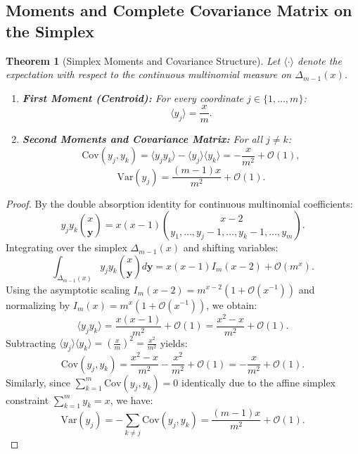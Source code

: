 \documentclass[11pt,a4paper]{article}
\theoremstyle{plain}
\newtheorem{theorem}{Theorem}[section]
\theoremstyle{definition}
\theoremstyle{remark}
\numberwithin{equation}{section}
\begin{document}
\subsection{Moments and Complete Covariance Matrix on the Simplex}

\begin{theorem}[Simplex Moments and Covariance Structure]
Let $\langle \cdot \rangle$ denote the expectation with respect to the continuous multinomial measure on $\Delta_{m-1}(x)$.
\begin{enumerate}
    \item \textbf{First Moment (Centroid):} For every coordinate $j \in \{1, \dots, m\}$:
    \begin{equation}
    \langle y_j \rangle = \frac{x}{m}.
    \end{equation}
    \item \textbf{Second Moments and Covariance Matrix:} For all $j \ne k$:
    \begin{equation}
    \mathrm{Cov}(y_j, y_k) = \langle y_j y_k \rangle - \langle y_j \rangle \langle y_k \rangle = -\frac{x}{m^2} + \mathcal{O}(1),
    \end{equation}
    \begin{equation}
    \mathrm{Var}(y_j) = \frac{(m-1)x}{m^2} + \mathcal{O}(1).
    \end{equation}
\end{enumerate}
\end{theorem}

\begin{proof}
By the double absorption identity for continuous multinomial coefficients:
\begin{equation}
y_j y_k \binom{x}{\mathbf{y}} = x(x-1) \binom{x-2}{y_1, \dots, y_j-1, \dots, y_k-1, \dots, y_m}.
\end{equation}
Integrating over the simplex $\Delta_{m-1}(x)$ and shifting variables:
\begin{equation}
\int_{\Delta_{m-1}(x)} y_j y_k \binom{x}{\mathbf{y}} d\mathbf{y} = x(x-1) I_m(x-2) + \mathcal{O}(m^x).
\end{equation}
Using the asymptotic scaling $I_m(x-2) = m^{x-2}(1 + \mathcal{O}(x^{-1}))$ and normalizing by $I_m(x) = m^x(1 + \mathcal{O}(x^{-1}))$, we obtain:
\begin{equation}
\langle y_j y_k \rangle = \frac{x(x-1)}{m^2} + \mathcal{O}(1) = \frac{x^2 - x}{m^2} + \mathcal{O}(1).
\end{equation}
Subtracting $\langle y_j \rangle \langle y_k \rangle = \left(\frac{x}{m}\right)^2 = \frac{x^2}{m^2}$ yields:
\begin{equation}
\mathrm{Cov}(y_j, y_k) = \frac{x^2 - x}{m^2} - \frac{x^2}{m^2} + \mathcal{O}(1) = -\frac{x}{m^2} + \mathcal{O}(1).
\end{equation}
Similarly, since $\sum_{k=1}^m \mathrm{Cov}(y_j, y_k) = 0$ identically due to the affine simplex constraint $\sum_{k=1}^m y_k = x$, we have:
\begin{equation}
\mathrm{Var}(y_j) = -\sum_{k \ne j} \mathrm{Cov}(y_j, y_k) = \frac{(m-1)x}{m^2} + \mathcal{O}(1).
\end{equation}
\end{proof}
\end{document}
